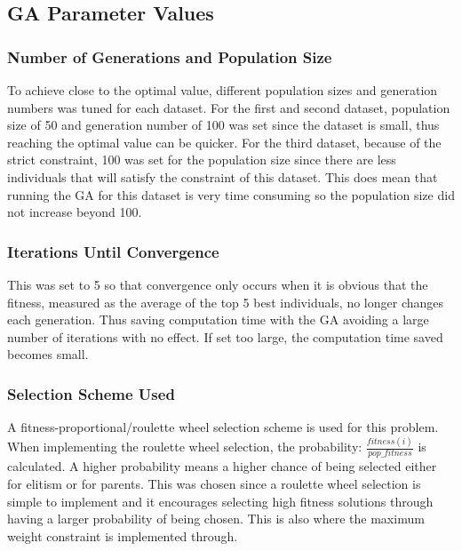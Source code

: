 \documentclass{article}
\begin{document}
\subsection*{GA Parameter Values}
\subsubsection*{Number of Generations and Population Size}
To achieve close to the optimal value, different population sizes and generation numbers was tuned for each dataset. For the first and second dataset, population size of 50 and generation number of 100 was set since the dataset is small, thus reaching the optimal value can be quicker. For the third dataset, because of the strict constraint, 100 was set for the population size since there are less individuals that will satisfy the constraint of this dataset. This does mean that running the GA for this dataset is very time consuming so the population size did not increase beyond 100.
\subsubsection*{Iterations Until Convergence}
This was set to 5 so that convergence only occurs when it is obvious that the fitness, measured as the average of the top 5 best individuals, no longer changes each generation. Thus saving computation time with the GA avoiding a large number of iterations with no effect. If set too large, the computation time saved becomes small.
\subsubsection*{Selection Scheme Used}
A fitness-proportional/roulette wheel selection scheme is used for this problem. When implementing the roulette wheel selection, the probability: $\frac{fitness(i)}{pop\_fitness}$ is calculated. A higher probability means a higher chance of being selected either for elitism or for parents. This was chosen since a roulette wheel selection is simple to implement and it encourages selecting high fitness solutions through having a larger probability of being chosen. This is also where the maximum weight constraint is implemented through. 
\end{document}
